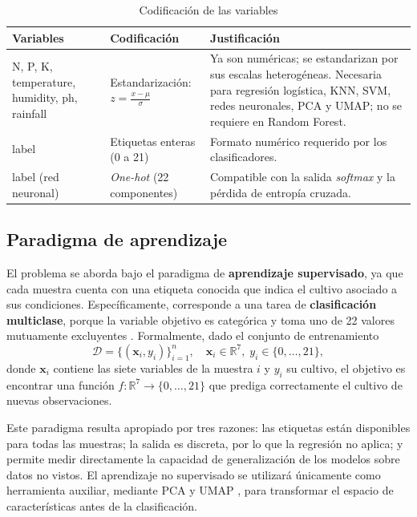\documentclass[conference]{IEEEtran}
\begin{document}
\begin{table}[htbp]
\caption{Codificación de las variables}
\label{tab:codificacion}
\centering
\footnotesize
\setlength{\tabcolsep}{4pt}
\begin{tabular}{>{\raggedright\arraybackslash}p{1.7cm}>{\raggedright\arraybackslash}p{2.2cm}>{\raggedright\arraybackslash}p{3.5cm}}
\toprule
\textbf{Variables} & \textbf{Codificación} & \textbf{Justificación} \\
\midrule
N, P, K, temperature, humidity, ph, rainfall & Estandarización: $z=\frac{x-\mu}{\sigma}$ & Ya son numéricas; se estandarizan por sus escalas heterogéneas. Necesaria para regresión logística, KNN, SVM, redes neuronales, PCA y UMAP; no se requiere en Random Forest. \\
\midrule
label & Etiquetas enteras (0 a 21) & Formato numérico requerido por los clasificadores. \\
\midrule
label (red neuronal) & \emph{One-hot} (22 componentes) & Compatible con la salida \emph{softmax} y la pérdida de entropía cruzada. \\
\bottomrule
\end{tabular}
\end{table}

\subsection{Paradigma de aprendizaje}

El problema se aborda bajo el paradigma de \textbf{aprendizaje supervisado}, ya que cada muestra cuenta con una etiqueta conocida que indica el cultivo asociado a sus condiciones. Específicamente, corresponde a una tarea de \textbf{clasificación multiclase}, porque la variable objetivo es categórica y toma uno de 22 valores mutuamente excluyentes \cite{bishop2006,hastie2009}. Formalmente, dado el conjunto de entrenamiento
\begin{equation}
\mathcal{D}=\{(\mathbf{x}_i,y_i)\}_{i=1}^{n},\quad \mathbf{x}_i\in\mathbb{R}^{7},\; y_i\in\{0,\dots,21\},
\end{equation}
donde $\mathbf{x}_i$ contiene las siete variables de la muestra $i$ y $y_i$ su cultivo, el objetivo es encontrar una función $f:\mathbb{R}^{7}\rightarrow\{0,\dots,21\}$ que prediga correctamente el cultivo de nuevas observaciones.

Este paradigma resulta apropiado por tres razones: las etiquetas están disponibles para todas las muestras; la salida es discreta, por lo que la regresión no aplica; y permite medir directamente la capacidad de generalización de los modelos sobre datos no vistos. El aprendizaje no supervisado se utilizará únicamente como herramienta auxiliar, mediante PCA \cite{hastie2009} y UMAP \cite{mcinnes2018}, para transformar el espacio de características antes de la clasificación.
\end{document}

